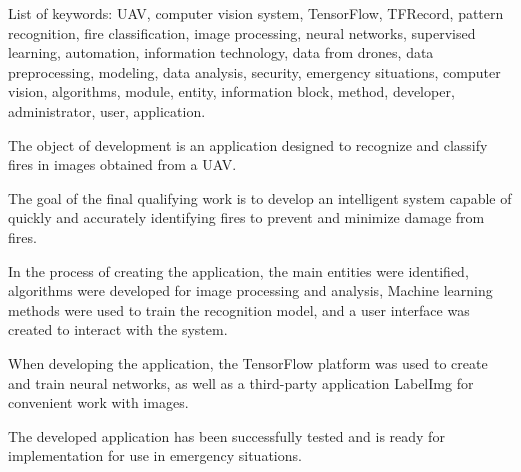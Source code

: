 List of keywords: UAV, computer vision system, TensorFlow, TFRecord, pattern recognition, fire classification, image processing, neural networks, supervised learning, automation, information technology, data from drones, data preprocessing, modeling, data analysis, security, emergency situations, computer vision, algorithms, module, entity, information block, method, developer, administrator, user, application.

The object of development is an application designed to recognize and classify fires in images obtained from a UAV.

The goal of the final qualifying work is to develop an intelligent system capable of quickly and accurately identifying fires to prevent and minimize damage from fires.

In the process of creating the application, the main entities were identified, algorithms were developed for image processing and analysis, Machine learning methods were used to train the recognition model, and a user interface was created to interact with the system.

When developing the application, the TensorFlow platform was used to create and train neural networks, as well as a third-party application LabelImg for convenient work with images.

The developed application has been successfully tested and is ready for implementation for use in emergency situations.
